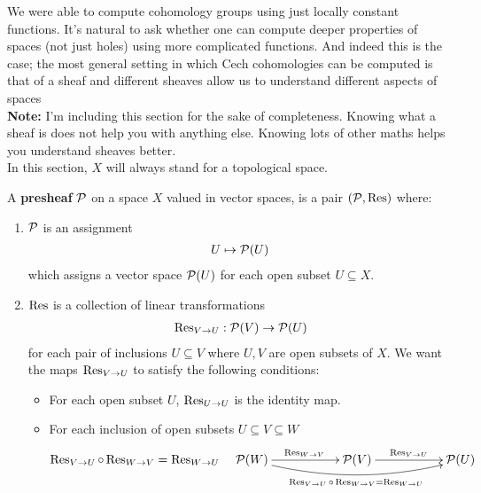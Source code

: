 We were able to compute cohomology groups using just locally constant functions. It's natural to ask whether one can compute deeper properties of spaces (not just holes) using more complicated functions. And indeed this is the case; the most general setting in which Cech cohomologies can be computed is that of a sheaf and different sheaves allow us to understand different aspects of spaces\\

\noindent	\textbf{Note: } I'm including this section for the sake of completeness. Knowing what a sheaf is does not help you with anything else. Knowing lots of other maths helps you understand sheaves better. \\

In this section, $X$ will always stand for a topological space.

\begin{definition}
	A \textbf{presheaf} $\P$ on a space $X$ valued in vector spaces, is a pair $(\P, \mor)$ where:
	\begin{enumerate}
		\item $\P$ is an assignment
		\begin{align*}
			 U \mapsto \P(U)
		\end{align*}
		which assigns a vector space $\P(U)$ for each open subset $ U \subseteq X$.
		\item $\mor$ is a collection of linear transformations
		\begin{align*}
			\mor_{V \rightarrow U}:\P(V) \rightarrow \P(U)
		\end{align*}
		for each pair of inclusions $U \subseteq V$ where $U, V$ are open subsets of $X$. We want the maps $\mor_{V \rightarrow U}$ to satisfy the following conditions:
		      \begin{itemize}
			      \item For each open subset $ U $, $ \mor_{U \rightarrow U}$ is the identity map.
			      \item For each inclusion of open subsets $ U \subseteq V \subseteq W$
						\begin{align*}
							\mor_{V\rightarrow U} \circ \mor_{W \rightarrow V} = \mor_{W \rightarrow U}
							&&
							\xymatrix{
				      \P(W) \ar@/_1pc/_{\mor_{V \rightarrow U} \circ \mor_{W \rightarrow V}= \mor_{W \rightarrow U}}[rrrr] \ar^{\mor_{W \rightarrow V}}[rr] && \P(V) \ar^{ \mor_{V\rightarrow U}}[rr] && \P(U)
				      }
						\end{align*}
		      \end{itemize}
	\end{enumerate}
\end{definition}

